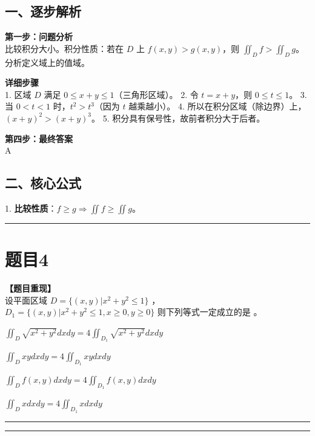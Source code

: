\documentclass[12pt, a4paper]{ctexart}
\newcommand{\TopSeparator}{
    \par\noindent\rule{\textwidth}{1.5pt}\vspace{0.5em} %
}
\newcommand{\AnalysisSeparator}{
    \par\noindent\rule{\textwidth}{0.5pt}\vspace{0.2em}\hrule\vspace{0.5em} %
}
\newenvironment{RedAnalysis}{
    \par
    \color{red} %
}{
    \par
    \color{black} %
}
\newcommand{\choicesTwo}[4]{
    \begin{enumerate}[label=\Alph*., itemsep=0pt, parsep=0pt, topsep=5pt, labelsep=0.5em]
        \begin{minipage}{0.45\linewidth} \item #1 \end{minipage}
        \begin{minipage}{0.45\linewidth} \item #2 \end{minipage}
        \begin{minipage}{0.45\linewidth} \item #3 \end{minipage}
        \begin{minipage}{0.45\linewidth} \item #4 \end{minipage}
    \end{enumerate}
}
\begin{document}
\begin{RedAnalysis}

\subsection*{一、逐步解析}

\textbf{第一步：问题分析} \\
比较积分大小。积分性质：若在 $D$ 上 $f(x,y) > g(x,y)$，则 $\iint_D f > \iint_D g$。
分析定义域上的值域。

\textbf{详细步骤} \\
1. 区域 $D$ 满足 $0 \le x+y \le 1$（三角形区域）。
2. 令 $t = x+y$，则 $0 \le t \le 1$。
3. 当 $0 < t < 1$ 时，$t^2 > t^3$（因为 $t$ 越乘越小）。
4. 所以在积分区域（除边界）上，$(x+y)^2 > (x+y)^3$。
5. 积分具有保号性，故前者积分大于后者。

\textbf{第四步：最终答案} \\
A

\subsection*{二、核心公式}
1. \textbf{比较性质}：$f \ge g \Rightarrow \iint f \ge \iint g$。

\end{RedAnalysis}

\vspace{2em}

\TopSeparator
\section*{题目4}

\textbf{【题目重现】} \\
设平面区域 $ D=\{(x,y)|x^{2}+y^{2}\leq1\} $ ， $ D_{1}=\{(x,y)|x^{2}+y^{2}\leq1,x\geq0,y\geq0\} $ 则下列等式一定成立的是 \underline{\hspace{1cm}}。
\choicesTwo
{$ \iint_{D}\sqrt{x^{2}+y^{2}}dxdy=4\iint_{D_{1}}\sqrt{x^{2}+y^{2}}dxdy $}
{$ \iint_{D} xydxdy = 4 \iint_{D_{1}} xydxdy $}
{$ \iint_{D} f(x,y)dxdy = 4 \iint_{D_{1}} f(x,y)dxdy $}
{$ \iint_{D} xdxdy = 4 \iint_{D_{1}} xdxdy $}

\AnalysisSeparator
\end{document}
